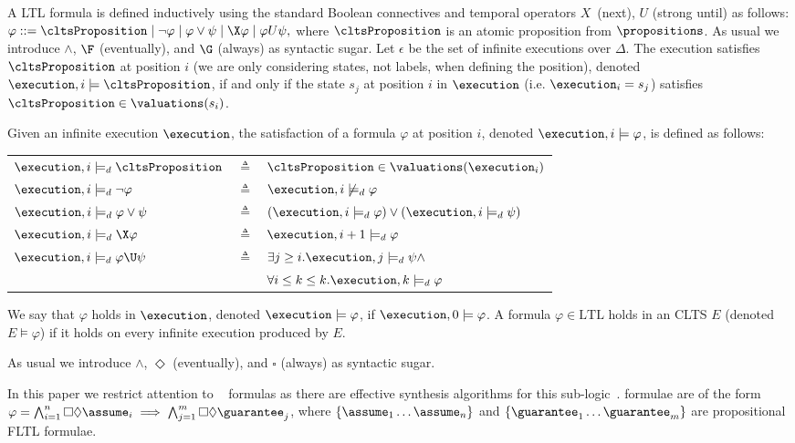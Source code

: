 A LTL formula is defined inductively using the standard Boolean connectives and temporal operators $X$~(next), $U$ (strong until) as follows: 
$\varphi ::= \cltsProposition \mid \neg \varphi \mid \varphi \vee \psi \mid \X \varphi \mid \varphi U \psi,$
where $\cltsProposition$ is an atomic proposition from $\propositions$. 
As usual we introduce $\wedge$, $\F$ (eventually), and $\G$ (always) as syntactic sugar. 
Let $\epsilon$ be the set of infinite executions over $\Delta$.
The execution \executionDef satisfies $\cltsProposition$ at position $i$ (we are only considering states, not labels, when defining the position), denoted $\execution,i \models \cltsProposition$, if and only if the state $s_j$ at position $i$ in $\execution$ (i.e. $\execution_i = s_j$)  satisfies $\cltsProposition \in \valuations(s_i)$.


Given an infinite execution $\execution$, the satisfaction of a formula $\varphi$ at position $i$, denoted $\execution,i\models\varphi$, is defined as follows:

\begin{tabular}{ l c l }
$\execution, i \models_d \cltsProposition$ & $\triangleq$ & $\cltsProposition \in \valuations(\execution_i)$\\
$\execution, i \models_d \neg \varphi$ & $\triangleq$ & $\execution, i \not\models_d \varphi$\\
$\execution, i \models_d \varphi \vee \psi$ & $\triangleq$ & $(\execution, i \models_d \varphi) \vee (\execution, i \models_d \psi)$\\
$\execution, i \models_d \X \varphi$ & $\triangleq$ & $\execution, i +1 \models_d \varphi$\\
$\execution, i \models_d \varphi \U \psi$ & $\triangleq$ & $\exists j \geq i . \execution,j \models_d \psi \wedge$\\
&& $\forall i \leq k \le k. \execution, k \models_d \varphi$\\
\end{tabular}

We say that $\varphi$ holds in $\execution$, denoted $\execution\models\varphi$, if $\execution,0\models\varphi$. 
A formula $\varphi \in \mbox{LTL}$ holds in an CLTS $E$ (denoted $E \models \varphi$) if it holds on every infinite execution produced by $E$.


As usual we introduce $\wedge$, $\Diamond$ (eventually), and $\square$ (always) as syntactic sugar. 

In this paper we restrict attention to \gr~\cite{DBLP:journals/jcss/BloemJPPS12} formulas as there are effective synthesis algorithms for this sub-logic~\cite{DBLP:journals/jcss/BloemJPPS12}. \gr formulae are of the form $\varphi = \bigwedge_{i=1}^n \square\Diamond \assume_i \implies \bigwedge_{j=1}^m \square\Diamond \guarantee_j$, where $\{\assume_1 \ldots \assume_n\}$ and $\{\guarantee_1 \ldots \guarantee_m\}$ are propositional FLTL formulae.


